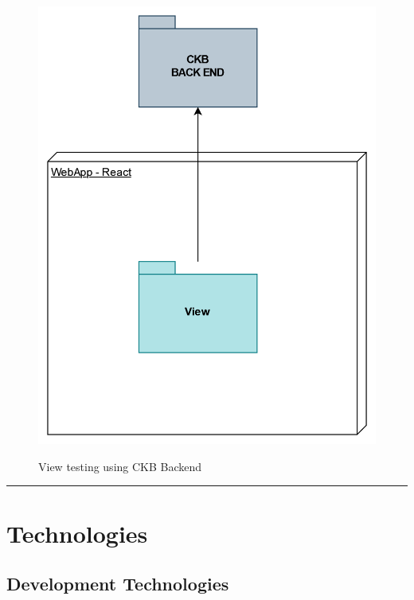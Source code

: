 \documentclass{Configuration_Files/Template}
\begin{document}
\begin{figure}[H]
\centering
\includegraphics[scale = 0.55]{Images/diagrams/ImplementationPlan_Full.png}\\
\caption{View testing using CKB Backend}
\end{figure}

{\color{bluepoli}\rule{\linewidth}{0.1pt}}

\section{Technologies}

\subsection{Development Technologies}
\end{document}
